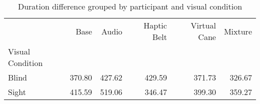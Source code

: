 
\begin{table}[!htb]
\centering
\caption{Duration difference grouped by participant and visual condition}
\label{tab:duracao_average_group}
\begin{tabular}{lrrrrr}
\toprule
{} &    Base &   Audio & Haptic Belt & Virtual Cane & Mixture \\
Visual Condition &         &         &             &              &         \\
\midrule
Blind            &  370.80 &  427.62 &      429.59 &       371.73 &  326.67 \\
Sight            &  415.59 &  519.06 &      346.47 &       399.30 &  359.27 \\
\bottomrule
\end{tabular}
\end{table}

